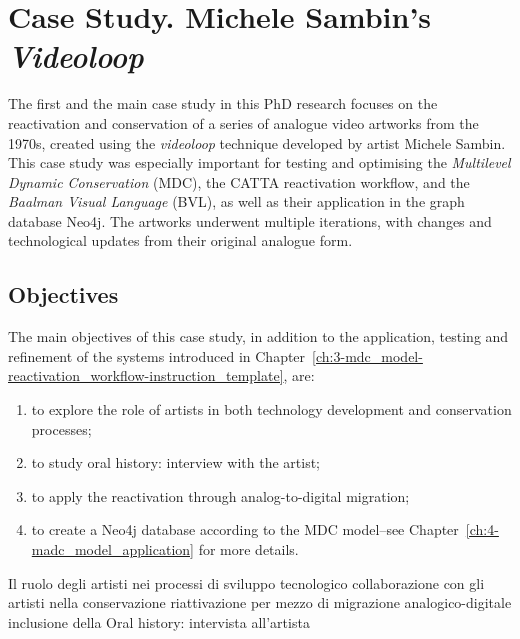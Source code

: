 \chapter{\label{ax:a-michele_sambin_videoloop}Case Study. Michele Sambin's \textit{Videoloop}}

The first and the main case study in this PhD research focuses on the reactivation and conservation of a series of analogue video artworks from the 1970s, created using the \textit{videoloop} technique developed by artist Michele Sambin. This case study was especially important for testing and optimising the \textit{Multilevel Dynamic Conservation} (MDC), the CATTA reactivation workflow, and the \textit{Baalman Visual Language} (BVL), as well as their application in the graph database Neo4j. The artworks underwent multiple iterations, with changes and technological updates from their original analogue form.

\section{Objectives}
The main objectives of this case study, in addition to the application, testing and refinement of the systems introduced in Chapter~\ref{ch:3-mdc_model-reactivation_workflow-instruction_template}, are:
\begin{enumerate}
    \item to explore the role of artists in both technology development and conservation processes;
    \item to study oral history: interview with the artist;
    \item to apply the reactivation through analog-to-digital migration;
    \item to create a Neo4j database according to the MDC model–see Chapter~\ref{ch:4-madc_model_application} for more details.
\end{enumerate}

Il ruolo degli artisti nei processi di sviluppo tecnologico
collaborazione con gli artisti nella conservazione
riattivazione per mezzo di migrazione analogico-digitale
inclusione della Oral history: intervista all'artista


